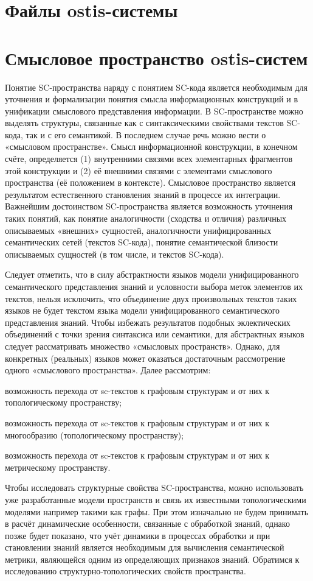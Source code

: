 \section{Файлы ostis-системы}
\label{sec_sr_ostisfiles}
\section{Смысловое пространство ostis-систем}
\label{sec_sr_semspace}
Понятие SC-пространства наряду с понятием SC-кода является необходимым для уточнения и формализации понятия смысла информационных конструкций и в унификации смыслового представления информации. В SC-пространстве можно выделять структуры, связанные как с синтаксическими свойствами текстов SC-кода, так и с его семантикой. В последнем случае речь можно вести о «смысловом пространстве». Смысл информационной конструкции, в конечном счёте, определяется (1) внутренними связями всех элементарных фрагментов этой конструкции и (2) её внешними связями с элементами смыслового пространства (её положением в контексте). Смысловое пространство является результатом естественного становления знаний в процессе их интеграции.
Важнейшим достоинством SC-пространства является возможность уточнения таких понятий, как понятие аналогичности (сходства и отличия) различных описываемых «внешних» сущностей, аналогичности унифицированных семантических сетей (текстов SC-кода), понятие семантической близости описываемых сущностей (в том числе, и текстов SC-кода).

Следует отметить, что в силу абстрактности языков модели унифицированного семантического представления знаний и условности выбора меток элементов их текстов, нельзя исключить, что объединение двух произвольных текстов таких языков не будет текстом языка модели унифицированного семантического представления знаний. Чтобы избежать результатов подобных эклектических объединений с точки зрения синтаксиса или семантики, для абстрактных языков следует рассматривать множество «смысловых пространств». Однако, для конкретных (реальных) языков может оказаться достаточным рассмотрение одного «смыслового пространства».
Далее рассмотрим:
\begin{scnitemize}
	\item возможность перехода от sc-текстов к графовым структурам и от них к топологическому пространству;
	\item возможность перехода от sc-текстов к графовым структурам и от них к многообразию (топологическому пространству);
	\item возможность перехода от sc-текстов к графовым структурам и от них к метрическому пространству.
\end{scnitemize}
Чтобы исследовать структурные свойства SC-пространства, можно использовать уже разработанные модели пространств и связь их известными топологическими моделями например такими как графы. При этом изначально не будем принимать в расчёт динамические особенности, связанные с обработкой знаний, однако позже будет показано, что учёт динамики в процессах обработки и при становлении знаний является необходимым для вычисления семантической метрики, являющейся одним из определяющих признаков знаний.
Обратимся к исследованию структурно-топологических свойств пространства.

